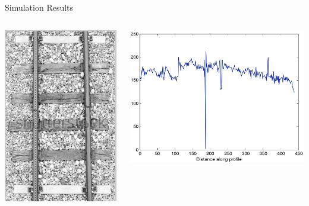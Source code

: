 
\begin{frame}{Simulation Results}
    
    \begin{columns}
        \begin{column}{0.45\textwidth}
            \includegraphics[width=0.75\columnwidth]{figures/railway4.png}
        \end{column}
        \hfill
        \begin{column}{0.45\textwidth}
            \includegraphics[width=\columnwidth]{figures/railway5.png}
        \end{column}
    \end{columns}

\end{frame}